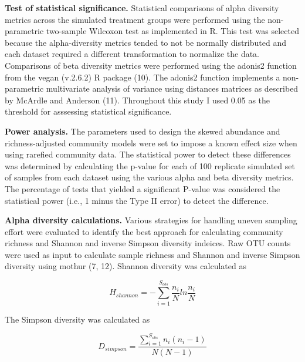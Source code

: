 \documentclass[
]{article}
\begin{document}
\textbf{Test of statistical significance.} Statistical comparisons of
alpha diversity metrics across the simulated treatment groups were
performed using the non-parametric two-sample Wilcoxon test as
implemented in R. This test was selected because the alpha-diversity
metrics tended to not be normally distributed and each dataset required
a different transformation to normalize the data. Comparisons of beta
diversity metrics were performed using the adonis2 function from the
vegan (v.2.6.2) R package (10). The adonis2 function implements a
non-parametric multivariate analysis of variance using distances
matrices as described by McArdle and Anderson (11). Throughout this
study I used 0.05 as the threshold for asssessing statistical
significance.

\textbf{Power analysis.} The parameters used to design the skewed
abundance and richness-adjusted community models were set to impose a
known effect size when using rarefied community data. The statistical
power to detect these differences was determined by calculating the
p-value for each of 100 replicate simulated set of samples from each
dataset using the various alpha and beta diversity metrics. The
percentage of tests that yielded a significant P-value was considered
the statistical power (i.e., 1 minus the Type II error) to detect the
difference.

\textbf{Alpha diversity calculations.} Various strategies for handling
uneven sampling effort were evaluated to identify the best approach for
calculating community richness and Shannon and inverse Simpson diversity
indeices. Raw OTU counts were used as input to calculate sample richness
and Shannon and inverse Simpson diversity using mothur (7, 12). Shannon
diversity was calculated as

\[H_{shannon} = - \sum_{i=1}^{S_{obs}} \frac{n_i}{N} ln \frac{n_i}{N}\]

The Simpson diversity was calculated as

\[D_{simpson} = \frac {\sum_{i=1}^{S_{obs}} {n_i \left ( n_i - 1 \right )}}{N \left( N-1 \right )}\]
\end{document}
